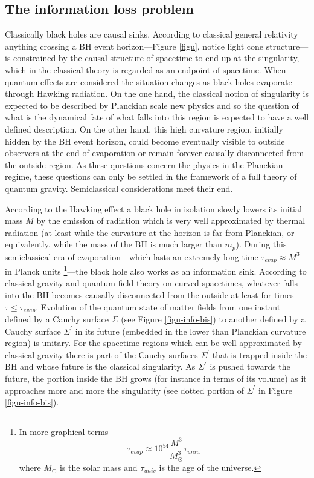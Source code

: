 \documentclass[aps, nofootinbib,superscriptaddress,12pt]{revtex4-2}
\begin{document}
\subsection{The information loss problem}\label{iloss}
 
Classically black holes are causal sinks. According to classical general relativity anything crossing a BH event horizon---Figure \ref{figu}, notice light cone structure---is constrained by the causal structure of spacetime to end up at the singularity, which in the classical theory is regarded as an endpoint of spacetime. When quantum effects are considered the situation changes as black holes evaporate through Hawking radiation. On the one hand, the classical notion of singularity is expected to be described by Planckian scale new physics and so the question of what is the dynamical fate of what falls into this region is expected to have a well defined description. On the other hand, this high curvature region, initially hidden by the BH event horizon, could become eventually visible to outside observers  at the end of evaporation or remain forever causally disconnected from the outside region. As these questions concern the physics in the Planckian regime, these questions can only be settled in the framework of a full theory of quantum gravity. Semiclassical considerations meet their end.

 According to the Hawking effect a black hole in isolation slowly lowers its initial mass $M$  by the emission of radiation which is very well approximated by thermal radiation (at least while the curvature at the horizon is far from Planckian, or equivalently, while the mass of the BH is much larger than $m_p$).  During this semiclassical-era of evaporation---which lasts an extremely long time $\tau_{evap}\approx M^3$ in Planck units \footnote{In more graphical terms $$\tau_{evap}\approx 10^{54} \frac{M^3}{M^3_{\odot}} \tau_{univ.}$$
where $M_{\odot}$ is the solar mass and $\tau_{univ}$ is the age of the universe.}---the black hole also works as an information sink. According to classical gravity and quantum field theory on curved spacetimes, whatever falls into the BH becomes causally disconnected from the outside at least for times $\tau \le \tau_{evap}$. Evolution of the quantum state of matter fields from one instant defined by a Cauchy surface $\Sigma$ (see Figure \ref{figu-info-bis}) to another defined by a Cauchy surface $\Sigma^\prime$ in its future (embedded in the lower than Planckian curvature region) is unitary. For the spacetime regions which can be well approximated by classical gravity there is part of the Cauchy surfaces $\Sigma^\prime$ that is trapped inside the BH and whose future is the classical singularity. As $\Sigma^\prime$ is pushed towards the future, the portion inside the BH grows (for instance in terms of its volume) as it approaches more and more the singularity (see dotted portion of $\Sigma^\prime$ in Figure \ref{figu-info-bis}). 
\end{document}
